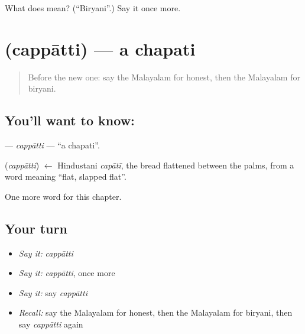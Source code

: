 \begin{tcolorbox}[breakable,colback=teal!4,colframe=teal!35!black,title={Before you move on}]
What does  mean? (\textquotedblleft{}Biryani\textquotedblright{}.) Say it once more.
\end{tcolorbox}
\section[\texorpdfstring{\ml{ചപ്പാത്തി} (cappātti)}{ചപ്പാത്തി (cappātti)}]{ (cappātti) — a chapati}

\label{lesson:ML-C322-cappatti}



\begin{quote}
Before the new one: say the Malayalam for honest, then the Malayalam for biryani.
\end{quote}

\subsection*{You'll want to know: }
\textbf{} — \emph{cappātti} — \textquotedblleft{}a chapati\textquotedblright{}.

\begin{cousinweb}
\textbf{} (\emph{cappātti}) $\leftarrow$ Hindustani \emph{capātī}, the bread flattened between the palms, from a word meaning \textquotedblleft{}flat, slapped flat\textquotedblright{}.
\end{cousinweb}

\begin{grammarlens}[title={What you've built}]
One more word for this chapter.
\end{grammarlens}

\subsection*{Your turn}
\begin{itemize}
\raggedright
  \item \emph{Say it:} \emph{cappātti}
  \item \emph{Say it:} \emph{cappātti}, once more
  \item \emph{Say it:} say \emph{cappātti}
  \item \emph{Recall:} say the Malayalam for honest, then the Malayalam for biryani, then say \emph{cappātti} again
\end{itemize}

